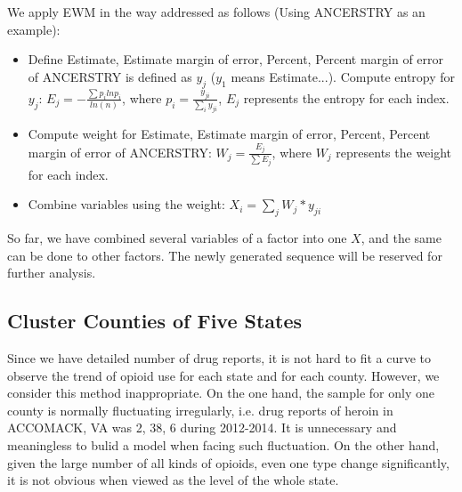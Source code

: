 \documentclass[12pt]{article}
\begin{document}
We apply EWM in the way addressed as follows (Using ANCERSTRY as an example):
\begin{itemize}
	\item Define Estimate, Estimate margin of error, Percent, Percent margin of error of ANCERSTRY is defined as $y_{j}$ ($y_{1}$ means Estimate...). Compute entropy for $y_{j}$: $ E_{j} = -\frac{\sum p_{i}lnp_{i}}{ln(n)}$, where $p_{i}=\frac{y_{ji}}{\sum_{i} y_{ji}}$, $E_{j}$ represents the entropy for each index.
	\item Compute weight for Estimate, Estimate margin of error, Percent, Percent margin of error of ANCERSTRY: $ W_{j} = \frac{E_{j}}{\sum E_{j}}$, where $W_{j}$ represents the weight for each index.
	\item Combine variables using the weight: $X_{i} = \sum_{j} W_{j} * y_{ji}$
\end{itemize}
So far, we have combined several variables of a factor into one $X$, and the same can be done to other factors. The newly generated sequence will be reserved for further analysis.

\subsection{Cluster Counties of Five States}
Since we have detailed number of drug reports, it is not hard to fit a curve to observe the trend of opioid use for each state and for each county. However, we consider this method inappropriate. On the one hand, the sample for only one county is normally fluctuating irregularly, i.e. drug reports of heroin in ACCOMACK, VA was 2, 38, 6 during 2012-2014. It is unnecessary and meaningless to bulid a model when facing such fluctuation. On the other hand, given the large number of all kinds of opioids, even one type change significantly, it is not obvious when viewed as the level of the whole state.
\end{document}
